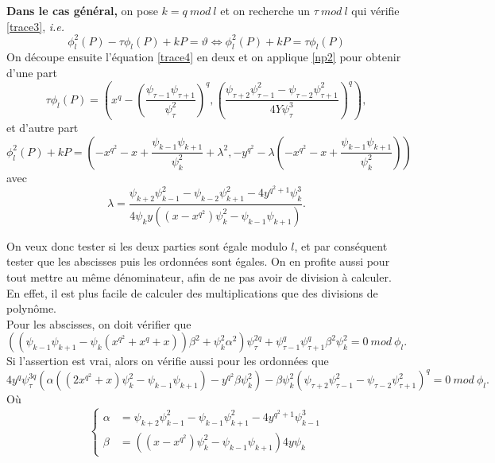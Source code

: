 \documentclass{article}%
\theoremstyle{plain}
\theoremstyle{definition}
\theoremstyle{plain}
\theoremstyle{plain}
\theoremstyle{remark}
\newcommand\ie{\textit{i.e.}}
\begin{document}
\textbf{Dans le cas général,} on pose $k=q\ mod\ l$ et on recherche un $\tau\ mod\ l$ qui vérifie \eqref{trace3}, \ie 
\begin{equation}
\phi_{l}^{2}(P) - \tau\phi_{l}(P) + kP = \vartheta \Longleftrightarrow \phi_{l}^{2}(P) + kP = \tau\phi_{l}(P) 
\label{trace4}
\end{equation} 
On découpe ensuite l'équation \eqref{trace4} en deux et on applique \eqref{np2} pour obtenir d'une part 
\begin{equation}
\tau\phi_{l}(P) = \left(x^{q} - \left(\dfrac{\psi_{\tau - 1}\psi_{\tau + 1}}{\psi_{\tau}^{2}}\right)^{q}, \left(\dfrac{\psi_{\tau + 2}\psi_{\tau - 1}^{2} - \psi_{\tau - 2}\psi_{\tau + 1}^{2}}{4Y\psi_{\tau}^{3}}\right)^{q}\right),
\label{tauphi}
\end{equation} 
et d'autre part
\begin{equation}
\phi_{l}^{2}(P) + kP = \left(-x^{q^{2}} - x + \dfrac{\psi_{k - 1}\psi_{k + 1}}{\psi_{k}^{2}} + \lambda^{2}, -y^{q^{2}} -\lambda\left(-x^{q^{2}} - x + \dfrac{\psi_{k - 1}\psi_{k + 1}}{\psi_{k}^{2}}\right)\right)
\label{tauphi1}
\end{equation} 
avec
\begin{equation}
\lambda = \dfrac{
\psi_{k + 2}\psi_{k - 1}^{2} - \psi_{k - 2}\psi_{k + 1}^{2} - 4y^{q^{2} + 1}\psi_{k}^{3}}{4\psi_{k}y((x - x^{q^{2}})\psi_{k}^{2} - \psi_{k - 1}\psi_{k + 1})}.
\label{lambda}
\end{equation}

On veux donc tester si les deux parties sont égale modulo $l$, et par conséquent tester que les abscisses puis les ordonnées sont égales. On en profite aussi pour tout mettre au même dénominateur, afin de ne pas avoir de division à calculer.
En effet, il est plus facile de calculer des multiplications que des divisions de polynôme.\\

Pour les abscisses, on doit vérifier que 
\begin{equation}
((\psi_{k - 1}\psi_{k + 1} - \psi_{k}(x^{q^{2}} + x^{q} + x))\beta^{2} + \psi_{k}^{2}\alpha^{2})\psi_{\tau}^{2q} + \psi_{\tau - 1}^{q}\psi_{\tau + 1}^{q}\beta^{2}\psi_{k}^{2} = 0\ mod\ \phi_{l}.
\label{abscisse} 
\end{equation}  
Si l'assertion est vrai, alors on vérifie aussi pour les ordonnées que 
\begin{equation}
4y^{q}\psi_{\tau}^{3q}(\alpha((2x^{q^{2}} + x)\psi_{k}^{2} - \psi_{k - 1}\psi_{k + 1}) - y^{q^{2}}\beta\psi_{k}^{2}) - \beta\psi_{k}^{2}(\psi_{\tau + 2}\psi_{\tau - 1}^{2} - \psi_{\tau - 2}\psi_{\tau + 1}^{2})^{q} = 0\ mod\ \phi_{l}.
\label{ordonnée} 
\end{equation}  
Où $$
\left\lbrace
\begin{aligned}
\alpha &= \psi_{k + 2}\psi_{k - 1}^{2} - \psi_{k - 1}\psi_{k +  1}^{2} - 4y^{q^{2} + 1}\psi_{k - 1}^{3}\\
\beta &= ((x - x^{q^{2}})\psi_{k}^{2} - \psi_{k - 1}\psi_{k + 1})4y\psi_{k}
\end{aligned}$$
\end{document}
